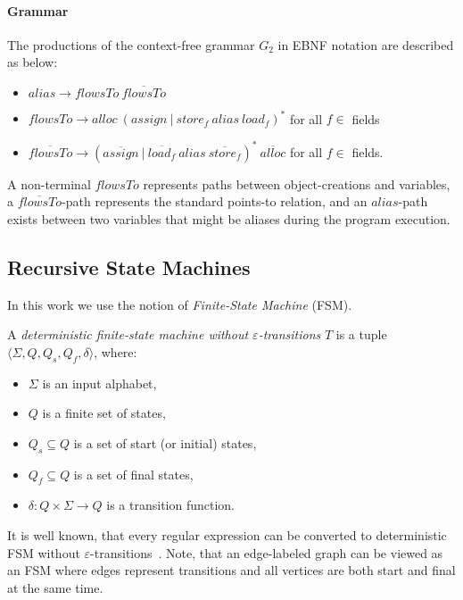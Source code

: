 \paragraph*{Grammar}
The productions of the context-free grammar $G_2$ in EBNF notation are described as below:
\begin{itemize}
\item $alias \rightarrow flowsTo\ \overline{flowsTo}$
\item $flowsTo \rightarrow alloc\ (assign\ |\ store_f\ alias\ load_f)^* $ for all $f \in$ fields
\item $\overline{flowsTo} \rightarrow (\overline{assign}\ |\ \overline{load_f}\ alias\ \overline{store_f})^*\ \overline{alloc}$  for all $f \in$ fields.
\end{itemize}
A non-terminal $flowsTo$ represents paths between object-creations and variables, a $\overline{flowsTo}$-path represents the standard points-to relation, and an $alias$-path exists between two variables that might be aliases during the program execution. 

\subsection{Recursive State Machines}
In this work we use the notion of \textit{Finite-State Machine} (FSM).

\begin{definition}
A \textit{deterministic finite-state machine without $\varepsilon$-transitions} $T$ is a tuple $\langle \Sigma, Q, Q_s, Q_f, \delta \rangle$, where:
\begin{itemize}
    \item $\Sigma$ is an input alphabet,
    \item $Q$ is a finite set of states,
    \item $Q_s \subseteq Q$ is a set of start (or initial) states,
    \item $Q_f \subseteq Q$ is a set of final states,
    \item $\delta: Q \times \Sigma \to Q$ is a transition function.
\end{itemize}
\end{definition}

It is well known, that every regular expression can be converted to deterministic FSM without $\varepsilon$-transitions~\cite{automata:theory:10.5555/1177300}. Note, that an edge-labeled graph can be viewed as an FSM where edges represent transitions and all vertices are both start and final at the same time.

